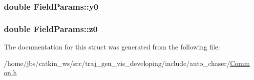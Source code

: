 \subsubsection[{\texorpdfstring{y0}{y0}}]{\setlength{\rightskip}{0pt plus 5cm}double Field\+Params\+::y0}\hypertarget{struct_field_params_ae9d400dadcfaaff44706adae06664c83}{}\label{struct_field_params_ae9d400dadcfaaff44706adae06664c83}
\subsubsection[{\texorpdfstring{z0}{z0}}]{\setlength{\rightskip}{0pt plus 5cm}double Field\+Params\+::z0}\hypertarget{struct_field_params_a51178f64cc93a37d6d8f774228c24a0f}{}\label{struct_field_params_a51178f64cc93a37d6d8f774228c24a0f}


The documentation for this struct was generated from the following file\+:\begin{DoxyCompactItemize}
\item 
/home/jbs/catkin\+\_\+ws/src/traj\+\_\+gen\+\_\+vis\+\_\+developing/include/auto\+\_\+chaser/\hyperlink{_common_8h}{Common.\+h}\end{DoxyCompactItemize}
